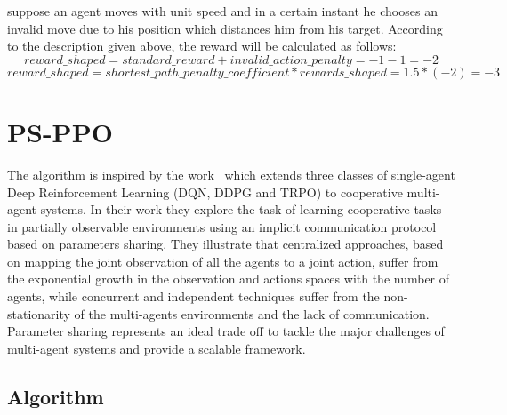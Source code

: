 \documentclass[11pt, a4paper, hidelinks]{report}
\begin{document}
suppose an agent moves with unit speed and in a certain instant he chooses an invalid move due to his position which distances him from his target.
According to the description given above, the reward will be calculated as follows:
\begin{displaymath}{reward\_shaped = standard\_reward + invalid\_action\_penalty = -1 -1 = -2}\end{displaymath}
\begin{displaymath}{reward\_shaped = shortest\_path\_penalty\_coefficient * rewards\_shaped = 1.5 * (-2)= -3}\end{displaymath}

\section{PS-PPO}\label{sec:ps-ppo}

The algorithm is inspired by the work~\citep{ps-ppo_paper} which extends three classes of single-agent Deep Reinforcement Learning (DQN, DDPG and TRPO) to cooperative multi-agent systems.
In their work they explore the task of learning cooperative tasks in partially observable environments using an implicit communication protocol based on parameters sharing.
They illustrate that centralized approaches, based on mapping the joint observation of all the agents to a joint action, suffer from the exponential growth in the observation and actions spaces with the number of agents, while concurrent and independent techniques suffer from the non-stationarity of the multi-agents environments and the lack of communication.
Parameter sharing represents an ideal trade off to tackle the major challenges of multi-agent systems and provide a scalable framework.

\subsection{Algorithm}\label{subsec:algorithm}
\end{document}
